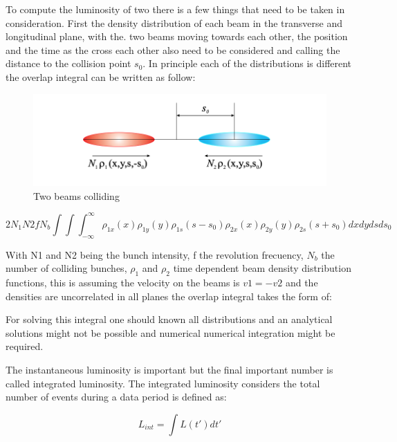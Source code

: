 To compute the luminosity of two there is a few things that need to be taken in consideration. First the density distribution of each beam in the transverse and longitudinal plane, with the. two beams moving towards each other, the position and the time as the cross each other also need to be considered and calling the distance to the collision point $s_{0}$. In principle each of the distributions is different the overlap integral can be written as follow:


\begin{figure}[h]
    \centering
    \includegraphics[width=1\textwidth]{lumi.png}
    \caption{Two beams colliding}
    \label{fig:beamslumi}
\end{figure}



\begin{equation}
 2N_{1}N{2}fN_{b} \int \int \int^{\infty}_{-\infty}  \rho_{1x} (x) \rho_{1y}(y) \rho_{1s} (s-s_{0}) \rho_{2x}(x) \rho_{2y}(y) \rho_{2s} (s+s_{0}) dxdydsds_{0}  
\end{equation}

With N1 and N2 being the bunch intensity, f the revolution frecuency, $N_{b}$ the number of colliding bunches, $\rho_{1}$ and $\rho_{2}$ time dependent beam density distribution functions, this is assuming the velocity on the beams is $v1 = -v2$ and the densities are uncorrelated in all planes the overlap integral takes the form of: \cite{Lumvdm}

For solving this integral one should known all distributions and an analytical solutions might not be possible and numerical numerical integration might be required.


The instantaneous luminosity is important  but the final important number is called integrated luminosity. The integrated luminosity considers the total number of events during a data period is defined as: 

\begin{equation}
 L_{int} = \int L (t') dt' 
\end{equation}

